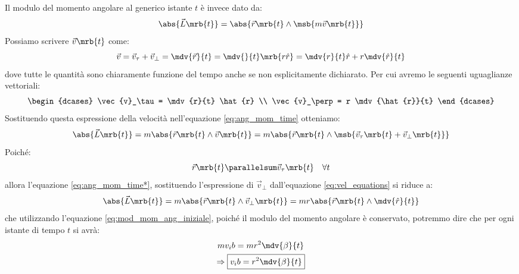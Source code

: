 \begin{itemize}
	      Il modulo del momento angolare al generico istante $t$ è invece dato da:
	      \begin{equation}
		      \abs{\vec{L}\mrb{t}} =
		      \abs{\vec{r}\mrb{t}\wedge\msb{m\vec{v}\mrb{t}}}
		      \label{eq:ang_mom_time}
	      \end{equation}
	      Possiamo scrivere $\vec{v}\mrb{t}$ come:
	      \begin{equation}
		      \vec{v} = \vec{v}_\tau + \vec{v}_\perp = \mdv{\vec{r}}{t} =
		      \mdv{}{t} \mrb{r\hat{r}} = \mdv{r}{t} \hat{r} + r\mdv{\hat{r}}{t}
	      \end{equation}
	      dove tutte le quantità sono chiaramente funzione del tempo anche se non
	      esplicitamente dichiarato.
	      Per cui avremo le seguenti uguaglianze vettoriali:
	      \begin{equation}
		      \begin{dcases}
			      \vec{v}_\tau = \mdv{r}{t} \hat{r} \\
			      \vec{v}_\perp = r \mdv{\hat{r}}{t}
		      \end{dcases}
		      \label{eq:vel_equations}
	      \end{equation}
	      Sostituendo questa espressione della velocità nell'equazione
	      \ref{eq:ang_mom_time} otteniamo:
	      \begin{equation}
		      \abs{\vec{L}\mrb{t}} = m
		      \abs{\vec{r}\mrb{t}\wedge\vec{v}\mrb{t}} =
		      m \abs{\vec{r}\mrb{t}\wedge\msb{\vec{v}_\tau \mrb{t} +
				      \vec{v}_\perp \mrb{t}}}
		      \label{eq:ang_mom_time*}
	      \end{equation}
	      Poiché:
	      \begin{equation}
		      \vec{r}\mrb{t} \parallelsum \vec{v}_\tau\mrb{t} \quad \forall t
	      \end{equation}
	      allora l'equazione \ref{eq:ang_mom_time*}, sostituendo l'espressione di
	      $\vec{v}_\perp$ dall'equazione
	      \ref{eq:vel_equations} si riduce a:
	      \begin{equation}
		      \abs{\vec{L}\mrb{t}} = m
		      \abs{\vec{r}\mrb{t}\wedge\vec{v}_\perp\mrb{t}} =
		      mr \abs{\vec{r}\mrb{t}\wedge\mdv{\hat{r}}{t}}
	      \end{equation}
	      che utilizzando l'equazione \ref{eq:mod_mom_ang_iniziale}, poiché il modulo
	      del momento angolare è conservato, potremmo dire che per ogni istante di
	      tempo $t$ si avrà:
	      \begin{equation}
		      \begin{gathered}
			      mv_ib = mr^2\mdv{\beta}{t}\\
			      \Rightarrow
			      \boxed{
				      v_ib = r^2 \mdv{\beta}{t}
			      }
		      \end{gathered}
		      \label{eq:deriv_beta}
	      \end{equation}


\end{itemize}
